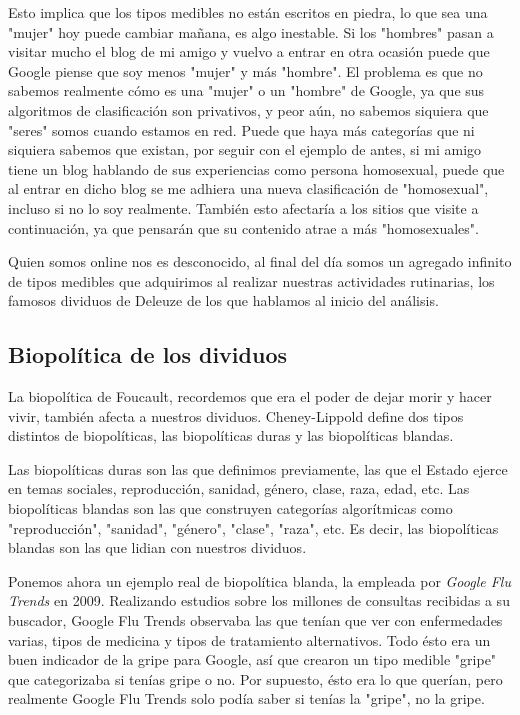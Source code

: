 \documentclass[11pt]{article}
\begin{document}
Esto implica que los tipos medibles no están escritos en piedra, lo que sea una "mujer" hoy puede cambiar mañana, es algo inestable. Si los "hombres" pasan a visitar mucho el blog de mi amigo y vuelvo a entrar en otra ocasión puede que Google piense que soy menos "mujer" y más "hombre". El problema es que no sabemos realmente cómo es una "mujer" o un "hombre" de Google, ya que sus algoritmos de clasificación son privativos, y peor aún, no sabemos siquiera que "seres" somos cuando estamos en red. Puede que haya más categorías que ni siquiera sabemos que existan, por seguir con el ejemplo de antes, si mi amigo tiene un blog hablando de sus experiencias como persona homosexual, puede que al entrar en dicho blog se me adhiera una nueva clasificación de "homosexual", incluso si no lo soy realmente. También esto afectaría a los sitios que visite a continuación, ya que pensarán que su contenido atrae a más "homosexuales".

Quien somos online nos es desconocido, al final del día somos un agregado infinito de tipos medibles que adquirimos al realizar nuestras actividades rutinarias, los famosos dividuos de Deleuze de los que hablamos al inicio del análisis.
\subsection{Biopolítica de los dividuos}
La biopolítica de Foucault, recordemos que era el poder de dejar morir y hacer vivir, también afecta a nuestros dividuos. Cheney-Lippold define dos tipos distintos de biopolíticas, las biopolíticas duras y las biopolíticas blandas.

Las biopolíticas duras son las que definimos previamente, las que el Estado ejerce en temas sociales, reproducción, sanidad, género, clase, raza, edad, etc. Las biopolíticas blandas son las que construyen categorías algorítmicas como "reproducción", "sanidad", "género", "clase", "raza", etc. Es decir, las biopolíticas blandas son las que lidian con nuestros dividuos.

Ponemos ahora un ejemplo real de biopolítica blanda, la empleada por \textit{Google Flu Trends} en 2009. Realizando estudios sobre los millones de consultas recibidas a su buscador, Google Flu Trends observaba las que tenían que ver con enfermedades varias, tipos de medicina y tipos de tratamiento alternativos. Todo ésto era un buen indicador de la gripe para Google, así que crearon un tipo medible "gripe" que categorizaba si tenías gripe o no. Por supuesto, ésto era lo que querían, pero realmente Google Flu Trends solo podía saber si tenías la "gripe", no la gripe.  
\end{document}
